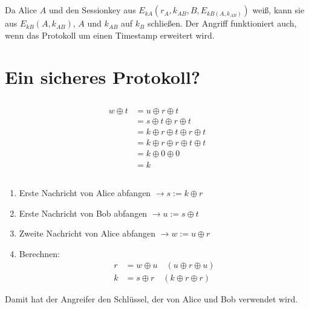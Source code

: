 \documentclass{../crypto}
\begin{document}


\subsection{}

Da Alice $A$ und den Sessionkey aus $E_{kA}(r_A,k_{AB},B,E_{kB(A,k_{AB})})$
weiß, kann sie aus $E_{kB}(A,k_{AB})$, $A$ und $k_{AB}$ auf $k_B$ schließen. Der
Angriff funktioniert auch, wenn das Protokoll um einen Timestamp erweitert wird.

\section{Ein sicheres Protokoll?}

\subsection{}
\begin{align*}
	w \oplus t & = u \oplus r \oplus t                   \\
	           & = s \oplus t \oplus r \oplus t          \\
	           & = k \oplus r \oplus t \oplus r \oplus t \\
	           & = k \oplus r \oplus r \oplus t \oplus t \\
	           & = k \oplus 0 \oplus 0                   \\
	           & = k
\end{align*}

\subsection{}

\begin{enumerate}
   \item Erste Nachricht von Alice abfangen $\rightarrow s := k \oplus r$
     \item Erste Nachricht von Bob abfangen $\rightarrow u := s \oplus t$
     \item Zweite Nachricht von Alice abfangen $\rightarrow w := u \oplus r$
     \item Berechnen: 
        \begin{align*}
           r & = w \oplus u \quad \left(u \oplus r \oplus u\right)\\
           k & = s \oplus r \quad \left(k \oplus r \oplus r\right)
        \end{align*}
\end{enumerate}
Damit hat der Angreifer den Schlüssel, der von Alice und Bob verwendet wird.
\end{document}
